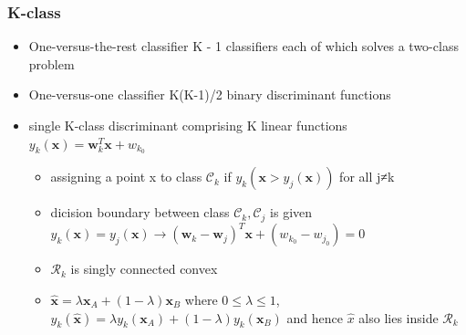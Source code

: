 \documentclass[11pt]{article}
\newcommand{\bl}[1] {\boldsymbol{#1}}
\begin{document}
\subsubsection{K-class}
\label{sec:orgfd6ece7}
\begin{itemize}
\item One-versus-the-rest classifier
K - 1 classifiers each of which solves a two-class problem
\item One-versus-one classifier
K(K-1)/2 binary discriminant functions
\item single K-class discriminant comprising K linear functions
\(y_k(\bl{x})=\bl{w}_k^T\bl{x}+w_{k_0}\)
\begin{itemize}
\item assigning a point x to class \(\mathcal{C}_k\) if
\(y_k(\bl{x}>y_j(\bl{x}))\) for all j≠k
\item dicision boundary between class \(\mathcal{C}_k, \mathcal{C}_j\) is given
\(y_k(\bl{x})=y_j(\bl{x})\to
        (\bl{w}_k-\bl{w}_j)^T\bl{x}+(w_{k_0}-w_{j_0})=0\)
\item \(\mathcal{R}_k\) is singly connected convex
\item \(\hat{\bl{x}}=\lambda\bl{x}_A+(1-\lambda)\bl{x}_B\) where \(0\le\lambda\le
        1\), \(y_k(\hat{\bl{x}})=\lambda y_k(\bl{x}_A)+(1-\lambda)y_k(\bl{x}_B)\)
and hence \(\hat{x}\) also lies inside \(\mathcal{R}_k\)
\end{itemize}
\end{itemize}
\end{document}

